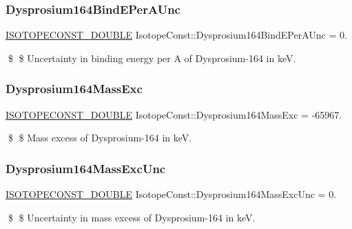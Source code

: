 \subsubsection{\texorpdfstring{Dysprosium164\+Bind\+E\+Per\+A\+Unc}{Dysprosium164BindEPerAUnc}}
{\footnotesize\ttfamily \mbox{\hyperlink{group___isotope_const-_macros_ga8f45a7272ce02c0b4c65c44636ed719a}{I\+S\+O\+T\+O\+P\+E\+C\+O\+N\+S\+T\+\_\+\+D\+O\+U\+B\+LE}} Isotope\+Const\+::\+Dysprosium164\+Bind\+E\+Per\+A\+Unc = 0.}

\$ \$ Uncertainty in binding energy per A of Dysprosium-\/164 in keV. \mbox{\label{group___isotope_const-_dysprosium-_dy164_gacde2b968304020b3ee5f4a48900208df}} 
\subsubsection{\texorpdfstring{Dysprosium164\+Mass\+Exc}{Dysprosium164MassExc}}
{\footnotesize\ttfamily \mbox{\hyperlink{group___isotope_const-_macros_ga8f45a7272ce02c0b4c65c44636ed719a}{I\+S\+O\+T\+O\+P\+E\+C\+O\+N\+S\+T\+\_\+\+D\+O\+U\+B\+LE}} Isotope\+Const\+::\+Dysprosium164\+Mass\+Exc = -\/65967.}

\$ \$ Mass excess of Dysprosium-\/164 in keV. \mbox{\label{group___isotope_const-_dysprosium-_dy164_ga042e0a0763fdd218e53e966040924fb4}} 
\subsubsection{\texorpdfstring{Dysprosium164\+Mass\+Exc\+Unc}{Dysprosium164MassExcUnc}}
{\footnotesize\ttfamily \mbox{\hyperlink{group___isotope_const-_macros_ga8f45a7272ce02c0b4c65c44636ed719a}{I\+S\+O\+T\+O\+P\+E\+C\+O\+N\+S\+T\+\_\+\+D\+O\+U\+B\+LE}} Isotope\+Const\+::\+Dysprosium164\+Mass\+Exc\+Unc = 0.}

\$ \$ Uncertainty in mass excess of Dysprosium-\/164 in keV. \mbox{\label{group___isotope_const-_dysprosium-_dy164_ga1d3c89d69f9d465b86d8576d812295b8}} 
